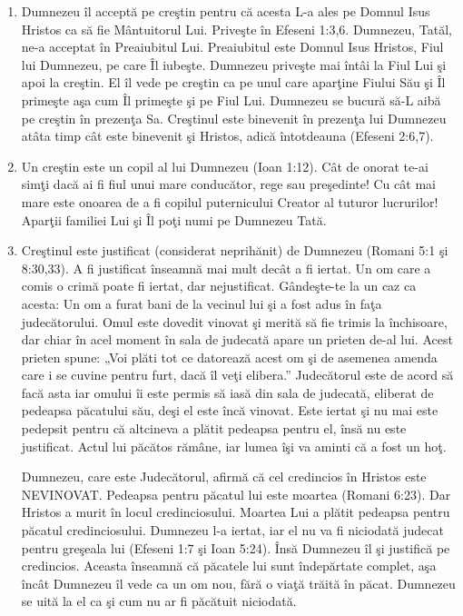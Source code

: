 \begin{enumerate}
	\item Dumnezeu îl acceptă pe creştin pentru că acesta L-a ales pe Domnul Isus Hristos ca să fie Mântuitorul Lui. Priveşte în Efeseni 1:3,6. Dumnezeu, Tatăl, ne-a acceptat în Preaiubitul Lui. Preaiubitul este Domnul Isus Hristos, Fiul lui Dumnezeu, pe care Îl iubeşte. Dumnezeu priveşte mai întâi la Fiul Lui şi apoi la creştin. El îl vede pe creştin ca pe unul care aparţine Fiului Său şi Îl primeşte aşa cum Îl primeşte şi pe Fiul Lui. Dumnezeu se bucură să-L aibă pe creştin în prezenţa Sa. Creştinul este binevenit în prezenţa lui Dumnezeu atâta timp cât este binevenit şi Hristos, adică întotdeauna (Efeseni 2:6,7).

\item Un creştin este un copil al lui Dumnezeu (Ioan 1:12). Cât de onorat te-ai simţi dacă ai fi fiul unui mare conducător, rege sau preşedinte! Cu cât mai mare este onoarea de a fi copilul puternicului Creator al tuturor lucrurilor! Aparţii familiei Lui şi Îl poţi numi pe Dumnezeu Tată.

\item Creştinul este justificat (considerat neprihănit) de Dumnezeu (Romani 5:1 şi 8:30,33). A fi justificat înseamnă mai mult decât a fi iertat. Un om care a comis o crimă poate fi iertat, dar nejustificat. Gândeşte-te la un caz ca acesta: Un om a furat bani de la vecinul lui şi a fost adus în faţa judecătorului. Omul este dovedit vinovat şi merită să fie trimis la închisoare, dar chiar în acel moment în sala de judecată apare un prieten de-al lui. Acest prieten spune: „Voi plăti tot ce datorează acest om şi de asemenea amenda care i se cuvine pentru furt, dacă îl veţi elibera.” Judecătorul este de acord să facă asta iar omului îi este permis să iasă din sala de judecată, eliberat de pedeapsa păcatului său, deşi el este încă vinovat. Este iertat şi nu mai este pedepsit pentru că altcineva a plătit pedeapsa pentru el, însă nu este justificat. Actul lui păcătos rămâne, iar lumea îşi va aminti că a fost un hoţ.

Dumnezeu, care este Judecătorul, afirmă că cel credincios în Hristos este NEVINOVAT. Pedeapsa pentru păcatul lui este moartea (Romani 6:23). Dar Hristos a murit în locul credinciosului. Moartea Lui a plătit pedeapsa pentru păcatul credinciosului. Dumnezeu l-a iertat, iar el nu va fi niciodată judecat pentru greşeala lui (Efeseni 1:7 şi Ioan 5:24). Însă Dumnezeu îl şi justifică pe credincios. Aceasta înseamnă că păcatele lui sunt îndepărtate complet, aşa încât Dumnezeu îl vede ca un om nou, fără o viaţă trăită în păcat. Dumnezeu se uită la el ca şi cum nu ar fi păcătuit niciodată.


\end{enumerate}

